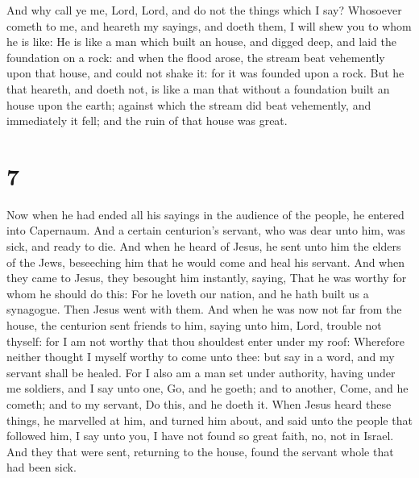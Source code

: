  And why call ye me, Lord, Lord, and do not the things
which I say?  Whosoever cometh to me, and heareth my
sayings, and doeth them, I will shew you to whom he is like:
 He is like a man which built an house, and digged deep,
and laid the foundation on a rock: and when the flood arose, the stream
beat vehemently upon that house, and could not shake it: for it was
founded upon a rock.  But he that heareth, and doeth not,
is like a man that without a foundation built an house upon the earth;
against which the stream did beat vehemently, and immediately it fell;
and the ruin of that house was great.

\hypertarget{section-6}{%
\section{7}\label{section-6}}

 Now when he had ended all his sayings in the audience of
the people, he entered into Capernaum.  And a certain
centurion's servant, who was dear unto him, was sick, and ready to die.
 And when he heard of Jesus, he sent unto him the elders of
the Jews, beseeching him that he would come and heal his servant.
 And when they came to Jesus, they besought him instantly,
saying, That he was worthy for whom he should do this:  For
he loveth our nation, and he hath built us a synagogue. 
Then Jesus went with them. And when he was now not far from the house,
the centurion sent friends to him, saying unto him, Lord, trouble not
thyself: for I am not worthy that thou shouldest enter under my roof:
 Wherefore neither thought I myself worthy to come unto
thee: but say in a word, and my servant shall be healed. 
For I also am a man set under authority, having under me soldiers, and I
say unto one, Go, and he goeth; and to another, Come, and he cometh; and
to my servant, Do this, and he doeth it.  When Jesus heard
these things, he marvelled at him, and turned him about, and said unto
the people that followed him, I say unto you, I have not found so great
faith, no, not in Israel.  And they that were sent,
returning to the house, found the servant whole that had been sick.

